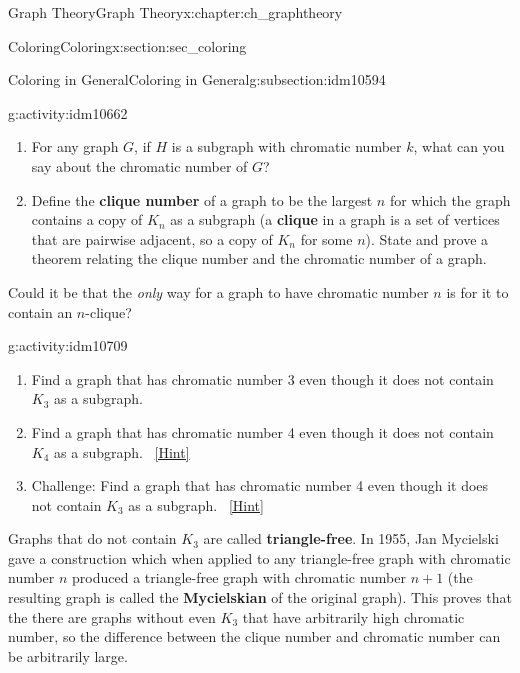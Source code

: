\documentclass[oneside,10pt,]{book}
\newcommand{\terminology}[1]{\textbf{#1}}
\numberwithin{equation}{chapter}
\newcommand{\vtx}[2]{node[fill,circle,inner sep=0pt, minimum size=4pt,label=#1:#2]{}}
\renewcommand{\v}{\vtx{above}{}}
\begin{document}
\begin{chapterptx}{Graph Theory}{}{Graph Theory}{}{}{x:chapter:ch_graphtheory}
\begin{sectionptx}{Coloring}{}{Coloring}{}{}{x:section:sec_coloring}
\begin{subsectionptx}{Coloring in General}{}{Coloring in General}{}{}{g:subsection:idm10594}
\begin{activity}{}{g:activity:idm10662}
\begin{enumerate}[font=\bfseries,label=(\alph*),ref=\alph*]
\begin{sidebyside}{1}{0.375}{0.375}{0}
\begin{sbspanel}{0.25}
{
}%
\end{sbspanel}%
\end{sidebyside}%
\qquad~\hfill{\tiny\hyperlink{g:hint:idm10669-back}{[Hint]}}\item{}For any graph \(G\), if \(H\) is a subgraph with chromatic number \(k\), what can you say about the chromatic number of \(G\)?%
\item{}Define the \terminology{clique number} of a graph to be the largest \(n\) for which the graph contains a copy of \(K_n\) as a subgraph (a \terminology{clique} in a graph is a set of vertices that are pairwise adjacent, so a copy of \(K_n\) for some \(n\)).  State and prove a theorem relating the clique number and the chromatic number of a graph.%
\end{enumerate}
\end{activity}
Could it be that the \emph{only} way for a graph to have chromatic number \(n\) is for it to contain an \(n\)-clique?%
\begin{activity}{}{g:activity:idm10709}%
\begin{enumerate}[font=\bfseries,label=(\alph*),ref=\alph*]
\item{}Find a graph that has chromatic number 3 even though it does not contain \(K_3\) as a subgraph.%
\item{}Find a graph that has chromatic number 4 even though it does not contain \(K_4\) as a subgraph.%
\qquad~\hfill{\tiny\hyperlink{g:hint:idm10721-back}{[Hint]}}\item{}Challenge: Find a graph that has chromatic number 4 even though it does not contain \(K_3\) as a subgraph.%
\qquad~\hfill{\tiny\hyperlink{g:hint:idm10735-back}{[Hint]}}\end{enumerate}
\end{activity}
Graphs that do not contain \(K_3\) are called \terminology{triangle-free}.  In 1955, Jan Mycielski gave a construction which when applied to any triangle-free graph with chromatic number \(n\) produced a triangle-free graph with chromatic number \(n+1\) (the resulting graph is called the \terminology{Mycielskian} of the original graph).  This proves that the there are graphs without even \(K_3\) that have arbitrarily high chromatic number, so the difference between the clique number and chromatic number can be arbitrarily large.%

\end{subsectionptx}
\end{sectionptx}
\end{chapterptx}
\end{document}
